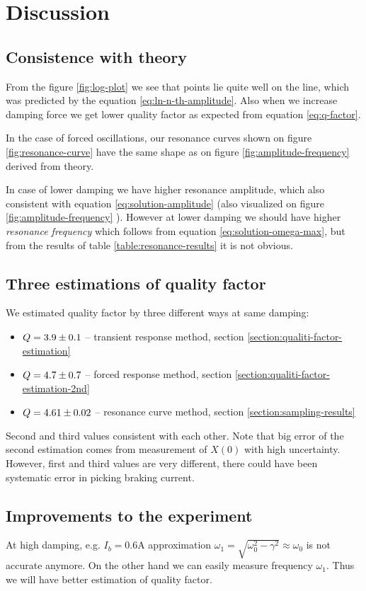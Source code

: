 \documentclass[12pt,a4paper]{article}
\begin{document}
\section{Discussion}\label{section:discuss}
	\subsection{Consistence with theory}
	From the figure \ref{fig:log-plot} we see that points lie quite well on the line, which was predicted by the equation \ref{eq:ln-n-th-amplitude}. Also when we increase damping force we get lower quality factor as expected from equation \ref{eq:q-factor}.
	
	In the case of forced oscillations, our resonance curves shown on figure \ref{fig:resonance-curve} have the same shape as on figure \ref{fig:amplitude-frequency} derived from theory.
	
	In case of lower damping we have higher resonance amplitude, which also consistent with equation \ref{eq:solution-amplitude} (also visualized on figure \ref{fig:amplitude-frequency} ).
	However at lower damping we should have higher \textit{resonance frequency} which follows from equation \ref{eq:solution-omega-max}, but from the results of table \ref{table:resonance-results} it is not obvious.
	
	\subsection{Three estimations of quality factor}
	We estimated quality factor by three different ways at same damping:
	\begin{itemize}
		\item $Q=\num{3.9 \pm 0.1}$ -- transient response method, section \ref{section:qualiti-factor-estimation}
		\item $Q=\num{4.7 \pm 0.7}$ -- forced response method, section \ref{section:qualiti-factor-estimation-2nd}
		\item $Q=\num{4.61 \pm 0.02}$ -- resonance curve method, section \ref{section:sampling-results}
	\end{itemize}
	Second and third values consistent with each other. Note that big error of the second estimation comes from measurement of $X(0)$ with high uncertainty.
	However, first and third values are very different, there could have been systematic error in picking braking current.
	
	\subsection{Improvements to the experiment}
	At high damping, e.g. $I_b = 0.6 \si{\ampere}$ approximation $\omega_1 = \sqrt{\omega_0^2-\gamma^2} \approx \omega_0$ is not accurate anymore. On the other hand we can easily measure frequency $\omega_1$. Thus we will have better estimation of quality factor.
	
\end{document}
